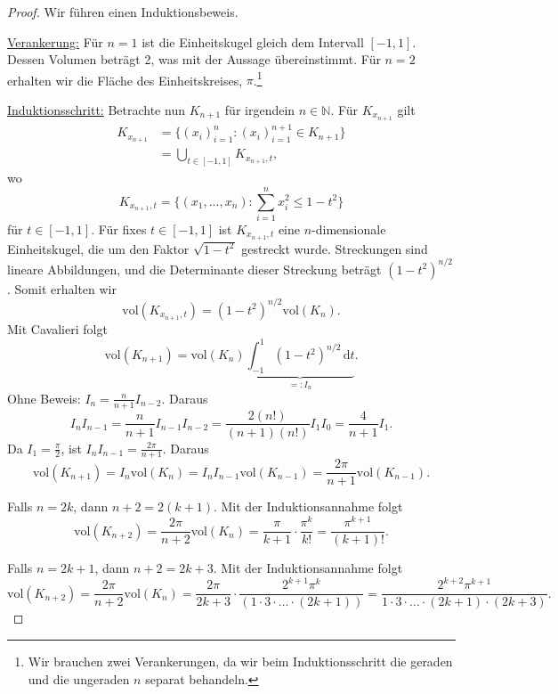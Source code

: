 \documentclass[10pt]{article}\usepackage[]{graphicx}\usepackage[]{color}
\newcommand{\N}{\mathbb{N}}
\newcommand{\df}{\,\textrm{d}}
\begin{document}
\begin{proof}
Wir führen einen Induktionsbeweis.

\uline{Verankerung:}
Für $n = 1$
ist die Einheitskugel gleich dem Intervall $[-1,1]$.
Dessen Volumen beträgt 2, was mit der Aussage übereinstimmt.
Für $n = 2$ erhalten wir die Fläche des Einheitskreises, $\pi$.\footnote{Wir brauchen zwei Verankerungen, da wir 
beim Induktionsschritt die geraden und die ungeraden $n$ separat behandeln.}

\uline{Induktionsschritt:}
Betrachte nun $K_{n+1}$ für irgendein $n \in \N$. 
Für $K_{x_{n+1}}$ gilt
\begin{align*}
  K_{x_{n+1}} 
  &= \{(x_i)^{n}_{i=1} : (x_i)_{i=1}^{n+1} \in K_{n+1}\} \\
  &= \bigcup_{t \in [-1, 1]} K_{x_{n+1}, t},
\end{align*}
wo
\[
  K_{x_{n+1}, t} = \{(x_1, \dots, x_{n}) : \sum_{i=1}^{n}x_i^2 \leq 1 - t^2\}
\]
für $t \in [-1,1]$.
Für fixes $t \in [-1,1]$ ist $K_{x_{n+1},t}$ eine $n$-dimensionale Einheitskugel,
die um den Faktor $\sqrt{1-t^2}$ gestreckt wurde. Streckungen sind lineare
Abbildungen, und die Determinante dieser Streckung beträgt $(1-t^2)^{n/2}$.
Somit erhalten wir
\[
  \textrm{vol}(K_{x_{n+1}, t}) = (1-t^2)^{n/2}\textrm{vol}(K_n).
\]
Mit Cavalieri folgt
\[
  \textrm{vol}(K_{n+1}) = \textrm{vol}(K_{n}) \underbrace{\int_{-1}^1 (1-t^2)^{n/2} \df t}_{=: I_{n}}.
\]
Ohne Beweis: $I_n = \frac{n}{n+1}I_{n-2}$. Daraus
\[
I_nI_{n-1} = \frac{n}{n+1}I_{n-1}I_{n-2} = \frac{2(n!)}{(n+1)(n!)} I_1 I_0 = \frac{4}{n+1}I_1.
\]
Da $I_1 = \frac{\pi}{2}$, ist $I_nI_{n-1} = \frac{2\pi}{n+1}$. Daraus
\[
 \textrm{vol}(K_{n+1}) = I_n\textrm{vol}(K_{n}) = I_nI_{n-1}\textrm{vol}(K_{n-1}) = \frac{2\pi}{n+1}\textrm{vol}(K_{n-1}).
\]

Falls $n = 2k$, dann $n+2 = 2(k+1)$. Mit der Induktionsannahme folgt
\[
 \textrm{vol}(K_{n+2}) = \frac{2\pi}{n+2}\textrm{vol}(K_n) = \frac{\pi}{k+1} \cdot \frac{\pi^k}{k!} = \frac{\pi^{k+1}}{(k+1)!}. 
\]

Falls $n = 2k+1$, dann $n+2 = 2k+3$. Mit der Induktionsannahme folgt
\[
  \textrm{vol}(K_{n+2}) = \frac{2\pi}{n+2}\textrm{vol}(K_n) = \frac{2\pi}{2k+3} \cdot \frac{2^{k+1}\pi^k}{(1\cdot 3 \cdot \dots \cdot (2k+1))} =
  \frac{2^{k+2}\pi^{k+1}}{1 \cdot 3 \cdot \dots \cdot (2k+1)\cdot(2k+3)}.
\]
\end{proof}

\end{document}
